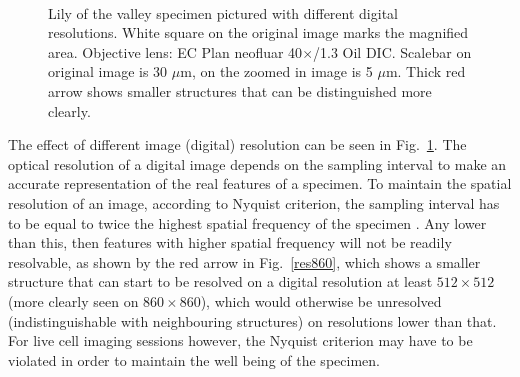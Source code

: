 \begin{figure}[h!]
\\
\caption{Lily of the valley specimen pictured with different digital resolutions. 
White square on the original image marks the magnified area. 
Objective lens: EC Plan neofluar 40$\times$/1.3 Oil DIC. Scalebar on original image is 30 $\mu$m, on the zoomed in image is 5 $\mu$m. 
Thick red arrow shows smaller structures that can be distinguished more clearly.} 
\label{fig:LSMres}
\end{figure}

The effect of different image (digital) resolution can be seen in Fig.~\ref{fig:LSMres}. 
The optical resolution of a digital image depends on the sampling interval to make an accurate representation of the real features of a specimen. 
To maintain the spatial resolution of an image, according to Nyquist criterion, the sampling interval has to be equal to twice the highest spatial frequency of the specimen \cite{ZeissCamp}. 
Any lower than this, then features with higher spatial frequency will not be readily resolvable, as shown by the red arrow in Fig.~\ref{res860}, which shows a smaller structure that can start to be resolved on a digital resolution at least $512\times512$ (more clearly seen on $860\times860$), which would otherwise be unresolved (indistinguishable with neighbouring structures) on resolutions lower than that. 
For live cell imaging sessions however, the Nyquist criterion may have to be violated in order to maintain the well being of the specimen.

